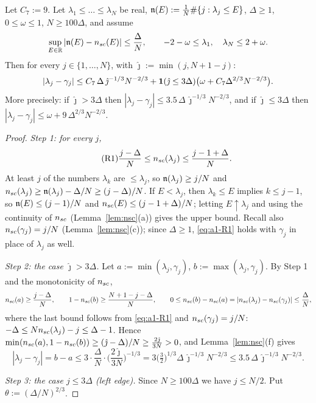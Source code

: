 \begin{lemma}\label{lem:conv}
Let $C_7:=9$. Let $\lambda_1\le\dots\le\lambda_N$ be real, $\mathfrak{n}(E):=\frac1N\#\{j:\lambda_j\le E\}$, $\Delta\ge1$, $0\le\omega\le1$, $N\ge 100\Delta$, and assume
\[
 \sup_{E\in\mathbb{R}}|\mathfrak{n}(E)-n_{sc}(E)|\le\frac\Delta N,\qquad-2-\omega\le\lambda_1,\quad\lambda_N\le2+\omega .
\]
Then for every $j\in\{1,\dots,N\}$, with $\hat\jmath:=\min(j,N+1-j)$:
\[
 |\lambda_j-\gamma_j|\le C_7\,\Delta\,\hat\jmath^{-1/3}N^{-2/3}+\mathbf{1}(\hat\jmath\le3\Delta)\big(\omega+C_7\Delta^{2/3}N^{-2/3}\big).
\]
More precisely: if $\hat\jmath>3\Delta$ then $|\lambda_j-\gamma_j|\le3.5\,\Delta\,\hat\jmath^{-1/3}N^{-2/3}$, and if $\hat\jmath\le3\Delta$ then $|\lambda_j-\gamma_j|\le\omega+9\,\Delta^{2/3}N^{-2/3}$.
\end{lemma}
\begin{proof}
\emph{Step 1: for every $j$,}
\begin{equation}\tag{R1}\label{eq:a1-R1}
 \frac{j-\Delta}N\le n_{sc}(\lambda_j)\le\frac{j-1+\Delta}N .
\end{equation}
At least $j$ of the numbers $\lambda_k$ are $\le\lambda_j$, so $\mathfrak{n}(\lambda_j)\ge j/N$ and $n_{sc}(\lambda_j)\ge\mathfrak{n}(\lambda_j)-\Delta/N\ge(j-\Delta)/N$.
If $E<\lambda_j$, then $\lambda_k\le E$ implies $k\le j-1$, so $\mathfrak{n}(E)\le(j-1)/N$ and $n_{sc}(E)\le(j-1+\Delta)/N$; letting $E\uparrow\lambda_j$ and using the continuity of $n_{sc}$ (Lemma~\ref{lem:nsc}(a)) gives the upper bound.
Recall also $n_{sc}(\gamma_j)=j/N$ (Lemma~\ref{lem:nsc}(c)); since $\Delta\ge1$, \eqref{eq:a1-R1} holds with $\gamma_j$ in place of $\lambda_j$ as well.

\emph{Step 2: the case $\hat\jmath>3\Delta$.} Let $a:=\min(\lambda_j,\gamma_j)$, $b:=\max(\lambda_j,\gamma_j)$. By Step 1 and the monotonicity of $n_{sc}$,
\[
 n_{sc}(a)\ge\frac{j-\Delta}N,\qquad1-n_{sc}(b)\ge\frac{N+1-j-\Delta}N,\qquad0\le n_{sc}(b)-n_{sc}(a)=|n_{sc}(\lambda_j)-n_{sc}(\gamma_j)|\le\frac\Delta N ,
\]
where the last bound follows from \eqref{eq:a1-R1} and $n_{sc}(\gamma_j)=j/N$: $-\Delta\le Nn_{sc}(\lambda_j)-j\le\Delta-1$. Hence $\min(n_{sc}(a),1-n_{sc}(b))\ge(\hat\jmath-\Delta)/N\ge\frac{2\hat\jmath}{3N}>0$, and Lemma~\ref{lem:nsc}(f) gives
\[
 |\lambda_j-\gamma_j|=b-a\le3\cdot\frac\Delta N\cdot\Big(\frac{2\hat\jmath}{3N}\Big)^{-1/3}=3\big(\tfrac32\big)^{1/3}\Delta\,\hat\jmath^{-1/3}N^{-2/3}\le3.5\,\Delta\,\hat\jmath^{-1/3}N^{-2/3}.
\]

\emph{Step 3: the case $j\le3\Delta$ (left edge).} Since $N\ge100\Delta$ we have $j\le N/2$. Put $\theta:=(\Delta/N)^{2/3}$.


\end{proof}
